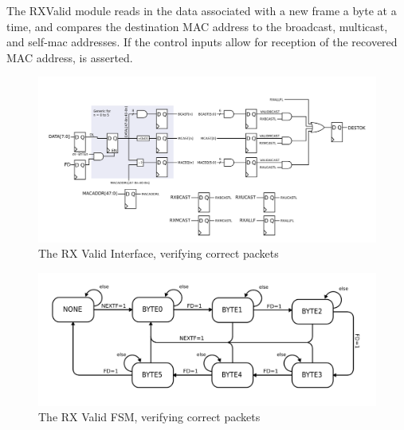The RXValid module reads in the data associated with a new frame a
byte at a time, and compares the destination MAC address to the
broadcast, multicast, and self-mac addresses. If the control inputs
allow for reception of the recovered MAC address,  is
asserted. 

\begin{figure}
\label{rxvalid}
\includegraphics[scale=0.7]{rxvalid.svg}
\caption{The RX Valid Interface, verifying correct packets}

\end{figure}

\begin{figure}
\label{rxvalidfsm}
\includegraphics[scale=0.7]{rxvalid.fsm.svg}
\caption{The RX Valid FSM, verifying correct packets}
\end{figure}

